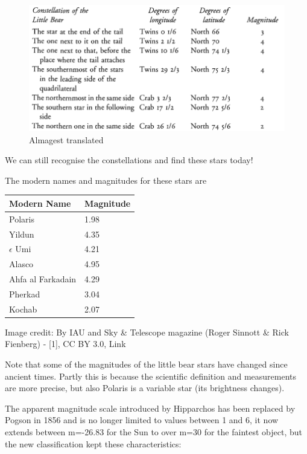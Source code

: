\documentclass[
  letterpaper,
  DIV=11,
  numbers=noendperiod]{scrartcl}
\begin{document}
\begin{figure}

{\centering \includegraphics{img/AlmagestTranslation.png}

}

\caption{Almagest translated}

\end{figure}

We can still recognise the constellations and find these stars today!

The modern names and magnitudes for these stars are

\begin{longtable}[]{@{}ll@{}}
\toprule\noalign{}
Modern Name & Magnitude \\
\midrule\noalign{}
\endhead
\bottomrule\noalign{}
\endlastfoot
Polaris & 1.98 \\
Yildun & 4.35 \\
\(\epsilon\) Umi & 4.21 \\
Alasco & 4.95 \\
Ahfa al Farkadain & 4.29 \\
Pherkad & 3.04 \\
Kochab & 2.07 \\
\end{longtable}

Image credit: By IAU and Sky \& Telescope magazine (Roger Sinnott \&
Rick Fienberg) - {[}1{]}, CC BY 3.0, Link

Note that some of the magnitudes of the little bear stars have changed
since ancient times. Partly this is because the scientific definition
and measurements are more precise, but also Polaris is a variable star
(its brightness changes).

The apparent magnitude scale introduced by Hipparchos has been replaced
by Pogson in 1856 and is no longer limited to values between 1 and 6, it
now extends between m=-26.83 for the Sun to over m=30 for the faintest
object, but the new classification kept these characteristics:
\end{document}
